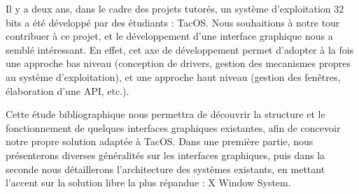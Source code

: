 Il y a deux ans, dans le cadre des projets tutorés, un système d'exploitation 32 bits a été développé par des étudiants : TacOS.
Nous souhaitions à notre tour contribuer à ce projet, et le développement d'une interface graphique nous a semblé intéressant.
En effet, cet axe de développement permet d'adopter à la fois une approche bas niveau (conception de drivers, gestion des mecanismes propres au système d'exploitation), et une approche haut niveau (gestion des fenêtres, élaboration d'une API, etc.).

Cette étude bibliographique nous permettra de découvrir la structure et le fonctionnement de quelques interfaces graphiques existantes, afin de concevoir notre propre solution adaptée à TacOS.
Dans une première partie, nous présenterons diverses généralités sur les interfaces graphiques, puis dans la seconde nous détaillerons l'architecture des systèmes existants, en mettant l'accent sur la solution libre la plus répandue : X Window System.
